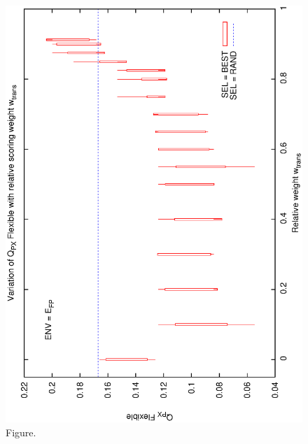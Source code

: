 \documentclass[12pt,a4paper]{article}
\begin{document}
\begin{figure}[htbp]
 \begin{center}
  \includegraphics[scale=1.0, angle=0]{figures/cs1_dw1_fpx.eps}
 \end{center}
  \caption[Figure.]
{Figure.}
\end{figure}
\clearpage
\end{document}
